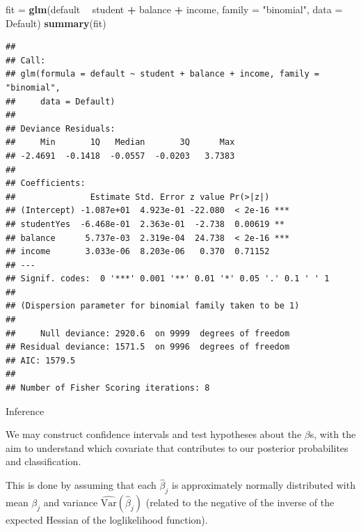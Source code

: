 \documentclass[10pt,ignorenonframetext,]{beamer}
\newenvironment{Shaded}{\begin{snugshade}}{\end{snugshade}}
\newcommand{\KeywordTok}[1]{\textcolor[rgb]{0.13,0.29,0.53}{\textbf{#1}}}
\newcommand{\DataTypeTok}[1]{\textcolor[rgb]{0.13,0.29,0.53}{#1}}
\newcommand{\StringTok}[1]{\textcolor[rgb]{0.31,0.60,0.02}{#1}}
\newcommand{\OperatorTok}[1]{\textcolor[rgb]{0.81,0.36,0.00}{\textbf{#1}}}
\newcommand{\NormalTok}[1]{#1}
\begin{document}
\begin{frame}[fragile]

\footnotesize

\begin{Shaded}
\begin{Highlighting}[]
\NormalTok{fit =}\StringTok{ }\KeywordTok{glm}\NormalTok{(default }\OperatorTok{~}\StringTok{ }\NormalTok{student }\OperatorTok{+}\StringTok{ }\NormalTok{balance }\OperatorTok{+}\StringTok{ }\NormalTok{income, }\DataTypeTok{family =} \StringTok{"binomial"}\NormalTok{, }
    \DataTypeTok{data =}\NormalTok{ Default)}
\KeywordTok{summary}\NormalTok{(fit)}
\end{Highlighting}
\end{Shaded}

\begin{verbatim}
## 
## Call:
## glm(formula = default ~ student + balance + income, family = "binomial", 
##     data = Default)
## 
## Deviance Residuals: 
##     Min       1Q   Median       3Q      Max  
## -2.4691  -0.1418  -0.0557  -0.0203   3.7383  
## 
## Coefficients:
##               Estimate Std. Error z value Pr(>|z|)    
## (Intercept) -1.087e+01  4.923e-01 -22.080  < 2e-16 ***
## studentYes  -6.468e-01  2.363e-01  -2.738  0.00619 ** 
## balance      5.737e-03  2.319e-04  24.738  < 2e-16 ***
## income       3.033e-06  8.203e-06   0.370  0.71152    
## ---
## Signif. codes:  0 '***' 0.001 '**' 0.01 '*' 0.05 '.' 0.1 ' ' 1
## 
## (Dispersion parameter for binomial family taken to be 1)
## 
##     Null deviance: 2920.6  on 9999  degrees of freedom
## Residual deviance: 1571.5  on 9996  degrees of freedom
## AIC: 1579.5
## 
## Number of Fisher Scoring iterations: 8
\end{verbatim}

\normalsize

\end{frame}

\begin{frame}

\begin{block}{Inference}

We may construct confidence intervals and test hypotheses about the
\(\beta\)s, with the aim to understand which covariate that contributes
to our posterior probabilites and classification.

This is done by assuming that each \(\hat{\beta}_j\) is approximately
normally distributed with mean \(\beta_j\) and variance
\(\hat{\text{Var}}(\hat{\beta}_j)\) (related to the negative of the
inverse of the expected Hessian of the loglikelihood function).

\end{block}

\end{frame}
\end{document}

